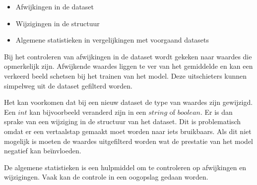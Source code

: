 \begin{itemize}
  \item Afwijkingen in de dataset
  \item Wijzigingen in de structuur
  \item Algemene statistieken in vergelijkingen met voorgaand datasets \cite[p.~44]{building-machine-learning-pipelines-oreilly}
\end{itemize}

Bij het controleren van afwijkingen in de dataset wordt gekeken naar waardes die opmerkelijk zijn. Afwijkende waardes liggen te ver van het gemiddelde en kan een verkeerd beeld schetsen bij het trainen van het model. Deze uitschieters kunnen simpelweg uit de dataset gefilterd worden.

Het kan voorkomen dat bij een nieuw dataset de type van waardes zijn gewijzigd. Een \(int\) kan bijvoorbeeld veranderd zijn in een \(string\) of \(boolean\). Er is dan sprake van een wijziging in de structuur van het dataset. Dit is problematisch omdat er een vertaalstap gemaakt moet worden naar iets bruikbaars. Als dit niet mogelijk is moeten de waardes uitgefilterd worden wat de prestatie van het model negatief kan beïnvloeden.

De algemene statistieken is een hulpmiddel om te controleren op afwijkingen en wijzigingen. Vaak kan de controle in een oogopslag gedaan worden. 





